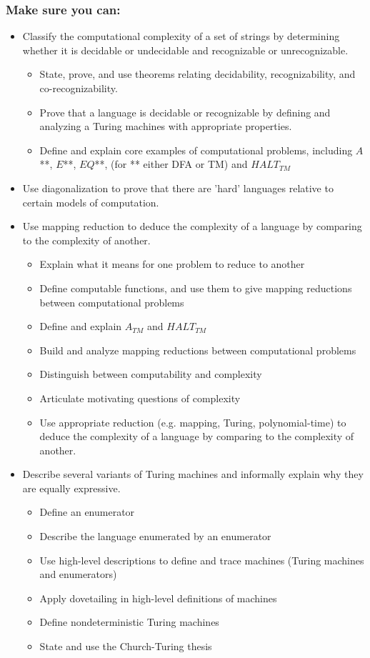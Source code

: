 \subsubsection*{Make sure you can:}
\begin{itemize}
\item Classify the computational complexity of a set of strings by determining whether it is decidable or undecidable and recognizable or unrecognizable.
\begin{itemize}
   \item State, prove, and use theorems relating decidability, recognizability, and co-recognizability.
   \item Prove that a language is decidable or recognizable by defining and analyzing a Turing machines with appropriate properties.
   \item Define and explain core examples of computational problems, including $A$**, $E$**, $EQ$**, (for ** either DFA or TM) and $HALT_{TM}$
\end{itemize}
\item Use diagonalization to prove that there are 'hard' languages relative to certain models of computation.
\item Use mapping reduction to deduce the complexity of a language by comparing to the complexity of another.
   \begin{itemize}
      \item Explain what it means for one problem to reduce to another
      \item Define computable functions, and use them to give mapping reductions between computational problems
      \item Define and explain $A_{TM}$ and $HALT_{TM}$
      \item Build and analyze mapping reductions between computational problems
      \item Distinguish between computability and complexity
      \item Articulate motivating questions of complexity
      \item Use appropriate reduction (e.g. mapping, Turing, polynomial-time) to deduce the complexity of a language by comparing to the complexity of another.
   \end{itemize}
\item  Describe several variants of Turing machines and informally explain why they are equally expressive.
   \begin{itemize}
   \item Define an enumerator
   \item Describe the language enumerated by an enumerator
   \item Use high-level descriptions to define and trace machines (Turing machines and enumerators)
   \item Apply dovetailing in high-level definitions of machines
   \item Define nondeterministic Turing machines
   \item State and use the Church-Turing thesis
   \end{itemize}
\end{itemize}


